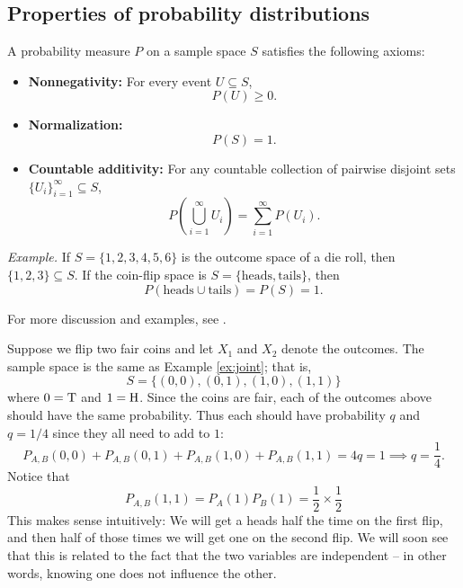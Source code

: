 \subsection{Properties of probability distributions}



A probability measure $P$ on a sample space $S$ satisfies the following axioms:
\begin{itemize}
\item \textbf{Nonnegativity:} For every event $U \subseteq S$, 
\[ P(U) \ge 0. \]
\item \textbf{Normalization:} 
\[ P(S) = 1. \]
\item \textbf{Countable additivity:} For any countable collection of pairwise disjoint sets $\{U_i\}_{i=1}^\infty \subseteq S$, 
\[ P\!\left(\bigcup_{i=1}^\infty U_i\right) = \sum_{i=1}^\infty P(U_i). \]
\end{itemize}

\emph{Example.} If $S=\{1,2,3,4,5,6\}$ is the outcome space of a die roll, then $\{1,2,3\}\subseteq S$.  
If the coin-flip space is $S=\{\text{heads},\text{tails}\}$, then
\[ P(\text{heads} \cup \text{tails}) = P(S) = 1. \]

For more discussion and examples, see \cite[Ch.~1, Sec.~1.2.1]{evans}.

\begin{example}\label{ex:twocoins} Suppose we flip two fair coins and let $X_1$ and $X_2$ denote the outcomes. The sample space is the same as Example \ref{ex:joint}; that is, 
\begin{equation*}
S = \{(0,0),(0,1),(1,0),(1,1)\}
\end{equation*}
where $0= {\rm T}$ and $1={\rm H}$. 
Since the coins are fair, each of the outcomes above should have the same probability. Thus each should have probability $q$ and $q=1/4$ since they all need to add to $1$:
\begin{equation*}
P_{A,B}(0,0) + P_{A,B}(0,1)+ P_{A,B}(1,0) + P_{A,B}(1,1) = 4q = 1 \implies q = \frac{1}{4}. 
\end{equation*}
Notice that 
\begin{equation*}
P_{A,B}(1,1) = P_A(1)P_B(1)  = \frac{1}{2} \times \frac{1}{2}
\end{equation*}
This makes sense intuitively: We will get a heads half the time on the first flip, and then half of those times we will get one on the second flip. 
We will soon see that this is related to the fact that the two variables are independent -- in other words, knowing one does not influence the other. 
\end{example}












